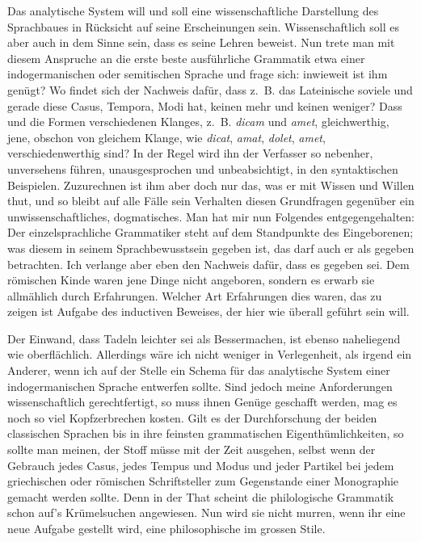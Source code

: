 Das analytische System will und soll eine wissenschaftliche Darstellung des Sprachbaues in Rücksicht auf seine Erscheinungen sein. Wissenschaftlich soll es aber auch in dem Sinne sein, dass es seine Lehren beweist. Nun trete man mit diesem Anspruche an die erste beste ausführliche Grammatik etwa einer indogermanischen oder semitischen Sprache und frage sich: inwieweit ist ihm \label{sp.92} genügt? Wo findet sich der Nachweis dafür, dass z.~B. das Lateinische soviele und gerade diese Casus, Tempora, Modi hat, keinen mehr und keinen weniger? Dass  und die Formen verschiedenen Klanges, z.~B. \textit{dicam} und \textit{amet}, gleichwer\-thig, jene, obschon von gleichem Klange, wie \textit{dicat}, \textit{amat}, \textit{dolet}, \textit{amet}, verschiedenwerthig sind? In der Regel wird ihn der Verfasser so nebenher, unversehens führen, unausgesprochen und unbeabsichtigt, in den syntaktischen Beispielen. Zuzurechnen ist ihm aber doch nur das, was er mit Wissen und Willen thut, und so bleibt auf alle Fälle sein Verhalten diesen Grundfragen gegenüber ein unwissenschaftliches, dogmatisches. Man hat mir nun Folgendes entgegengehalten: Der einzelsprachliche Grammatiker steht auf dem Standpunkte des Eingeborenen; was diesem in seinem Sprachbewusstsein gegeben ist, das darf auch er als gegeben betrachten. Ich verlange aber eben den Nachweis dafür, dass es gegeben sei. Dem römischen Kinde waren jene Dinge nicht angeboren, sondern es erwarb sie allmählich durch Erfahrungen. Welcher Art Erfahrungen dies waren, das zu zeigen ist Aufgabe des inductiven Beweises, der hier wie überall geführt sein will.

Der Einwand, dass Tadeln leichter sei als Bessermachen, ist ebenso naheliegend wie oberflächlich. Allerdings wäre ich nicht weniger in Verlegenheit, als irgend ein Anderer, wenn ich auf der Stelle ein Schema für das analytische System einer indogermanischen Sprache entwerfen sollte. Sind jedoch meine Anforderungen wissenschaftlich gerechtfertigt, \label{fp.95} so muss ihnen Genüge geschafft werden, mag es noch so viel Kopfzerbrechen kosten. Gilt es der Durchforschung der beiden classischen Sprachen bis in ihre feinsten grammatischen Eigenthümlichkeiten, so sollte man meinen, der Stoff müsse mit der Zeit ausgehen, selbst wenn der Gebrauch jedes Casus, jedes Tempus und Modus und jeder Partikel bei jedem griechischen oder römischen Schriftsteller zum Gegenstande einer Monographie gemacht werden sollte. Denn in der That scheint die philologische Grammatik schon auf’s Krümelsuchen angewiesen. Nun wird sie nicht murren, wenn ihr eine neue Aufgabe gestellt wird, eine philosophische im grossen Stile.

